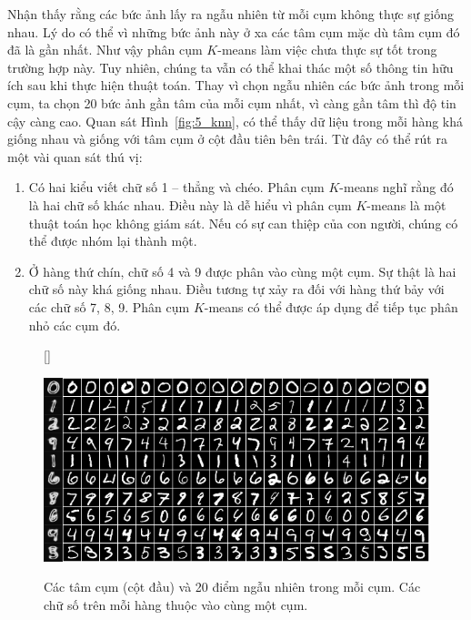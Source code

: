 Nhận thấy rằng các bức ảnh lấy ra ngẫu nhiên từ mỗi cụm không thực sự giống
nhau. Lý do có thể vì những bức ảnh này ở xa các tâm cụm mặc dù tâm cụm đó đã là
gần nhất. Như vậy phân cụm $K$-means làm việc chưa thực sự tốt trong trường hợp
này. Tuy nhiên, chúng ta vẫn có thể khai thác một số thông tin hữu ích sau khi
thực hiện thuật toán. Thay vì chọn ngẫu nhiên các bức ảnh trong mỗi cụm, ta chọn
20 bức ảnh gần tâm của mỗi cụm nhất, vì càng gần tâm thì độ tin cậy càng cao.
Quan sát Hình~\ref{fig:5_knn}, có thể thấy dữ liệu trong mỗi hàng khá giống nhau
và giống với tâm cụm ở cột đầu tiên bên trái. Từ đây có thể rút ra một vài quan
sát thú vị:

\begin{enumerate}
    \item Có hai kiểu viết chữ số 1 -- thẳng và chéo. Phân cụm $K$-means
    nghĩ rằng đó là hai chữ số khác nhau. Điều này là dễ hiểu vì phân cụm $K$-means
    là một thuật toán học không giám sát. Nếu có sự can thiệp của
    con người, chúng có thể được nhóm lại thành một. 


    \item Ở hàng thứ chín, chữ số 4 và 9 được phân vào cùng một cụm. Sự
    thật là hai chữ số này khá giống nhau. Điều tương tự xảy ra đối với
    hàng thứ bảy với các chữ số 7, 8, 9. Phân cụm $K$-means có thể được áp dụng để tiếp tục phân nhỏ các cụm đó.

\end{enumerate}

\begin{figure}[t]
    [\FBwidth]
    {\caption{ 
    Các tâm cụm (cột đầu) và 20 điểm {ngẫu nhiên} trong mỗi cụm. Các chữ số trên mỗi hàng thuộc vào cùng một cụm.
    }
    \label{fig:5_random}}
    { %
    \includegraphics[width=.65\textwidth]{Chapters/03_SimpleML/4_kmeans/kmeans_random_gray.png}
    }
\end{figure}

